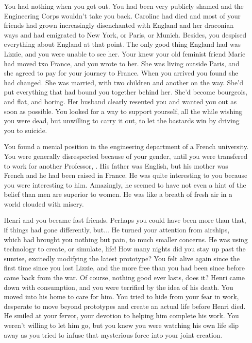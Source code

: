 \documentclass[char]{airship}
\begin{document}
You had nothing when you got out. You had been very publicly shamed
and the Engineering Corps wouldn't take you back. Caroline had died
and most of your friends had grown increasingly disenchanted with
England and her draconian ways and had emigrated to New York, or
Paris, or Munich. Besides, you despised everything about England at
that point. The only good thing England had was Lizzie, and you were
unable to see her. Your knew your old feminist friend Marie had moved
txo France, and you wrote to her. She was living outside Paris, and she
agreed to pay for your journey to France. When you arrived you found
she had changed. She was married, with two children and another on the
way. She'd put everything that had bound you together behind
her. She'd become bourgeois, and flat, and boring. Her husband clearly
resented you and wanted you out as soon as possible. You looked for a
way to support yourself, all the while wishing you were dead, but
unwilling to carry it out, to let the bastards win by driving you to
suicide.

You found a menial position in the engineering department of a French
university. You were generally disrespected because of your gender,
until you were transfered to work for another Professor,
\cHenri{\intro}. His father was English, but his mother was French and
he had been raised in France. He was quite interesting to you because
you were interesting to him. Amazingly, he seemed to have not even a
hint of the belief than men are superior to women. He was like a
breath of fresh air in a world clouded with misery. 
 
Henri and you became fast friends. Perhaps you could have been more
than that, if things had gone differently, but... He turned your
attention from airships, which had brought you nothing but pain, to
much smaller concerns. He was using technology to create, or simulate,
life! How many nights did you stay up past the sunrise, excitedly
modifying the latest prototype? You felt alive again since the first
time since you lost Lizzie, and the more free than you had been since
before \cCaptain{} came back from the war. Of course, nothing good
ever lasts, does it? Henri came down with consumption, and you were
terrified by the idea of his death. You moved into his home to care
for him. You tried to hide from your fear in work, desperate to move
beyond prototypes and create an actual life before Henri died. He
smiled at your fervor, your devotion to helping him complete his
work. You weren't willing to let him go, but you knew you were
watching his own life slip away as you tried to infuse that mysterious
force into your joint creation.
\end{document}
